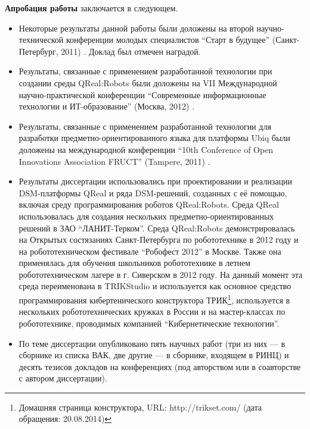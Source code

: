 \textbf{Апробация работы} заключается в следующем.
\begin{itemize}
	\item Некоторые результаты данной работы были доложены на второй 
		научно-технической конференции молодых специалистов "`Старт в будущее"' 
		(Санкт-Петербург, 2011) \cite{kuzenkova2011metamodeling}. Доклад был 
		отмечен наградой.
	\item Результаты, связанные с применением разработанной технологии при 
		создании среды QReal:Robots были доложены на VII Международной 
		научно-практической конференции "`Современные информационные технологии 
		и ИТ-образование"' (Москва, 2012) \cite{litvinov2012robots}.
	\item Результаты, связанные с применением разработанной технологии для 
		разработки предметно-ориентированного языка для платформы Ubiq были доложены 
		на международной конференции "`10th Conference of Open Innovations 
		Association FRUCT"' (Tampere, 2011) \cite{bryksin2011ubiq}.
	\item Результаты диссертации использовались  при проектировании и реализации 
		\ac{DSM}-платформы QReal и ряда \ac{DSM}-решений, созданных с её помощью, включая 
		среду программирования роботов QReal:Robots. Среда QReal использовалась для 
		создания нескольких предметно-ориентированных решений в ЗАО “ЛАНИТ-Терком”. 
		Среда QReal:Robots демонстрировалась на Открытых состязаниях 
		Санкт-Петербурга по робототехнике в 2012 году и на робототехническом 
		фестивале "`Робофест 2012"' в Москве. Также она применялась для обучения 
		школьников робототехнике в летнем робототехническом лагере в 
		г. Сиверском в 2012 году. На данный момент эта среда переименована в 
		TRIKStudio и используется как основное средство программирования 
		кибертенического конструктора 
		ТРИК\footnote{Домашняя страница конструктора, URL: http://trikset.com/ (дата обращения: 20.08.2014)},
		используется в нескольких робототехнических кружках в России и на мастер-классах
		по робототехнике, проводимых компанией "`Кибернетические технологии"'.
	\item По теме диссертации опубликовано пять научных работ (три из них ---
		в сборнике из списка ВАК, две другие --- в сборнике, входящем в РИНЦ) и 
		десять тезисов докладов на конференциях (под авторством или в соавторстве с 
		автором диссертации).
\end{itemize}

